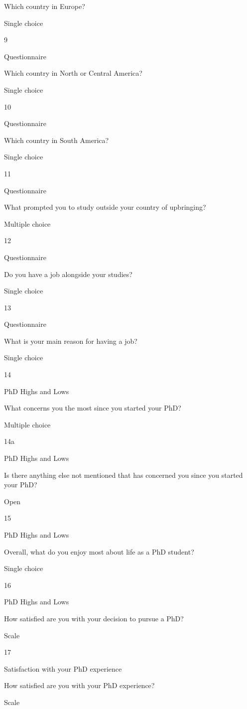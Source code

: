\documentclass[
]{article}
\begin{document}
Which country in Europe?

Single choice

9

Questionnaire

Which country in North or Central America?

Single choice

10

Questionnaire

Which country in South America?

Single choice

11

Questionnaire

What prompted you to study outside your country of upbringing?

Multiple choice

12

Questionnaire

Do you have a job alongside your studies?

Single choice

13

Questionnaire

What is your main reason for having a job?

Single choice

14

PhD Highs and Lows

What concerns you the most since you started your PhD?

Multiple choice

14a

PhD Highs and Lows

Is there anything else not mentioned that has concerned you since you
started your PhD?

Open

15

PhD Highs and Lows

Overall, what do you enjoy most about life as a PhD student?

Single choice

16

PhD Highs and Lows

How satisfied are you with your decision to pursue a PhD?

Scale

17

Satisfaction with your PhD experience

How satisfied are you with your PhD experience?

Scale
\end{document}
